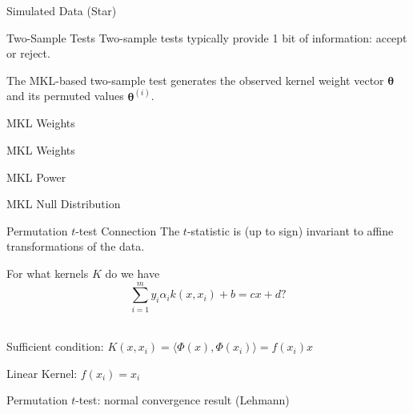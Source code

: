 \documentclass{beamer}
\begin{document}
\begin{frame}{Simulated Data (Star)}
  \begin{center}
    \resizebox{10.0cm}{!}{
      
    }
  \end{center}
\end{frame}

\begin{frame}{Two-Sample Tests}
  Two-sample tests typically provide 1 bit of information: accept or reject. \\ \pause

  The MKL-based two-sample test generates the observed kernel weight vector ${\boldsymbol \theta}$ and
  its permuted values ${\boldsymbol \theta}^{(i)}$.
\end{frame}

\begin{frame}{MKL Weights}
  \begin{center}
    \resizebox{10.0cm}{!}{
      
    }
  \end{center}
\end{frame}

\begin{frame}{MKL Weights}
  \begin{center}
    \resizebox{10.0cm}{!}{
      
    }
  \end{center}
\end{frame}

\begin{frame}{MKL Power}
  \begin{center}
    \resizebox{10.0cm}{!}{
      
    }
  \end{center}
\end{frame}

\begin{frame}{MKL Null Distribution}
  \begin{center}
    \resizebox{10.0cm}{!}{
      
    }
  \end{center}
\end{frame}

\begin{frame}{Permutation $t$-test Connection}
  The $t$-statistic is (up to sign) invariant to affine transformations of the data. \\ \pause

  For what kernels $K$ do we have
  \begin{equation*}
    \sum_{i=1}^m y_i \alpha_i k(x, x_i) + b = cx + d?
  \end{equation*} \\ \pause

  Sufficient condition: $K(x, x_i) = \langle \Phi(x), \Phi(x_i) \rangle =
  f(x_i) x$ \\ \pause

  Linear Kernel: $f(x_i) = x_i$ \\ \pause

  Permutation $t$-test: normal convergence result (Lehmann)
\end{frame}
\end{document}
